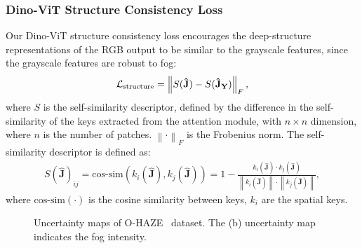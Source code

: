 \documentclass[runningheads]{llncs}
\begin{document}
\subsubsection{Dino-ViT Structure Consistency Loss}
Our Dino-ViT structure consistency loss encourages the deep-structure representations of the RGB output to be similar to the grayscale features, since the grayscale features are robust to fog: 
\begin{align}
\mathcal{L}_{\rm structure} = \left \|  S(\mathbf{\hat{J}})-S(\mathbf{\hat{J}_Y}) \right \| _{F},
\label{eq:loss_structure}
\end{align} 
where $S$ is the self-similarity descriptor, defined by the difference in the self-similarity of the keys extracted from the attention module, with $n \times n$ dimension, where $n$ is the number of patches. 
$\left \| \cdot \right \| _{F}$ is the Frobenius norm.
The self-similarity descriptor is defined as:
\begin{align}
S(\mathbf{\hat{J}})_{ij} = \text{cos-sim}(k_i(\mathbf{\hat{J}}), k_j(\mathbf{\hat{J}})) = 1 - \frac{k_i(\mathbf{\hat{J}}) \cdot k_j(\mathbf{\hat{J}})} {\left \| k_i(\mathbf{\hat{J}}) \right \| \cdot \left \| k_j(\mathbf{\hat{J}}) \right \| },
\label{eq:loss_sel}
\end{align} 
where $\text{cos-sim}(\cdot)$ is the cosine similarity between keys, $k_i$ are the spatial keys. 

\begin{figure}[t]
	\centering
		\captionsetup[subfloat]{labelformat=empty}
		\setcounter{subfigure}{0}
		\hfill
		\hfill
		\hfill
		\setcounter{subfigure}{0}
		\hfill
		\hfill
		\hfill
	\caption{Uncertainty maps of O-HAZE~\cite{ancuti2018haze} dataset. The (b) uncertainty map indicates the fog intensity.}
	\label{fig:density}
\end{figure}
\end{document}
